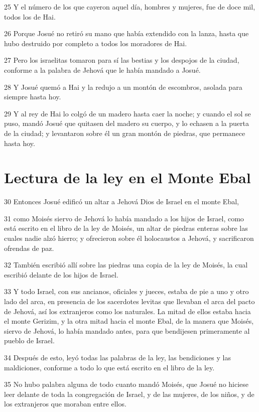 \par 25 Y el número de los que cayeron aquel día, hombres y mujeres, fue de doce mil, todos los de Hai.
\par 26 Porque Josué no retiró su mano que había extendido con la lanza, hasta que hubo destruido por completo a todos los moradores de Hai.
\par 27 Pero los israelitas tomaron para sí las bestias y los despojos de la ciudad, conforme a la palabra de Jehová que le había mandado a Josué.
\par 28 Y Josué quemó a Hai y la redujo a un montón de escombros, asolada para siempre hasta hoy.
\par 29 Y al rey de Hai lo colgó de un madero hasta caer la noche; y cuando el sol se puso, mandó Josué que quitasen del madero su cuerpo, y lo echasen a la puerta de la ciudad; y levantaron sobre él un gran montón de piedras, que permanece hasta hoy.

\section*{Lectura de la ley en el Monte Ebal}

\par 30 Entonces Josué edificó un altar a Jehová Dios de Israel en el monte Ebal,
\par 31 como Moisés siervo de Jehová lo había mandado a los hijos de Israel, como está escrito en el libro de la ley de Moisés, un altar de piedras enteras sobre las cuales nadie alzó hierro; y ofrecieron sobre él holocaustos a Jehová, y sacrificaron ofrendas de paz.
\par 32 También escribió allí sobre las piedras una copia de la ley de Moisés, la cual escribió delante de los hijos de Israel. 
\par 33 Y todo Israel, con sus ancianos, oficiales y jueces, estaba de pie a uno y otro lado del arca, en presencia de los sacerdotes levitas que llevaban el arca del pacto de Jehová, así los extranjeros como los naturales. La mitad de ellos estaba hacia el monte Gerizim, y la otra mitad hacia el monte Ebal, de la manera que Moisés, siervo de Jehová, lo había mandado antes, para que bendijesen primeramente al pueblo de Israel.
\par 34 Después de esto, leyó todas las palabras de la ley, las bendiciones y las maldiciones, conforme a todo lo que está escrito en el libro de la ley.
\par 35 No hubo palabra alguna de todo cuanto mandó Moisés, que Josué no hiciese leer delante de toda la congregación de Israel, y de las mujeres, de los niños, y de los extranjeros que moraban entre ellos. 

